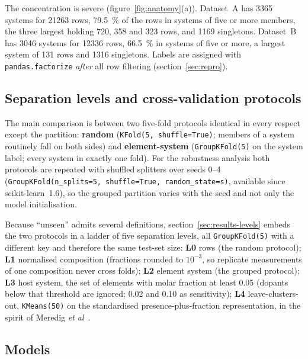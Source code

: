 \documentclass{iopjournal}
\newcommand{\etal}{\textit{et al}}
\begin{document}
The concentration is severe (figure~\ref{fig:anatomy}(a)). Dataset~A has \num{3365} systems for
\num{21263} rows, \SI{79.5}{\percent} of the rows in systems of five or more members, the three
largest holding \num{720}, \num{358} and \num{323} rows, and \num{1169} singletons. Dataset~B has
\num{3046} systems for \num{12336} rows, \SI{66.5}{\percent} in systems of five or more, a largest
system of \num{131} rows and \num{1316} singletons. Labels are assigned with
\texttt{pandas.factorize} \emph{after} all row filtering (section~\ref{sec:repro}).

\subsection{Separation levels and cross-validation protocols}
\label{sec:protocols}

The main comparison is between two five-fold protocols identical in every respect except the
partition: \textbf{random} (\texttt{KFold(5, shuffle=True)}; members of a system routinely fall on
both sides) and \textbf{element-system} (\texttt{GroupKFold(5)} on the system label; every system
in exactly one fold). For the robustness analysis both protocols are repeated with shuffled
splitters over seeds \numrange{0}{4} (\texttt{GroupKFold(n\_splits=5, shuffle=True,
random\_state=s)}, available since scikit-learn~1.6), so the grouped partition varies with the seed
and not only the model initialisation.

Because ``unseen'' admits several definitions, section~\ref{sec:results-levels} embeds the two
protocols in a ladder of five separation levels, all \texttt{GroupKFold(5)} with a different key
and therefore the same test-set size: \textbf{L0} rows (the random protocol); \textbf{L1}
normalised composition (fractions rounded to $10^{-3}$, so replicate measurements of one
composition never cross folds); \textbf{L2} element system (the grouped protocol);
\textbf{L3} host system, the set of elements with molar fraction at least \num{0.05} (dopants
below that threshold are ignored; \num{0.02} and \num{0.10} as sensitivity); \textbf{L4}
leave-clusters-out, \texttt{KMeans(50)} on the standardised presence-plus-fraction representation,
in the spirit of Meredig \etal~\cite{meredig2018}.

\subsection{Models}
\label{sec:models}
\end{document}
